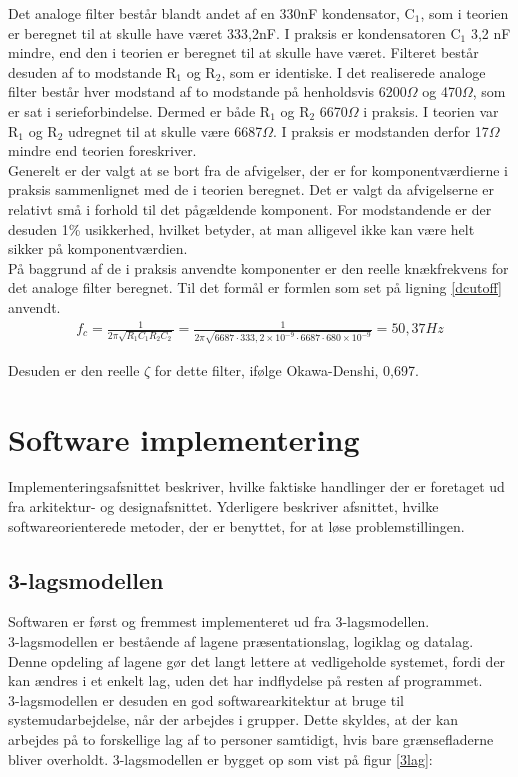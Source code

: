 Det analoge filter består blandt andet af en 330nF kondensator, C$_1$, som i teorien er beregnet til at skulle have været 333,2nF. I praksis er kondensatoren C$_1$ 3,2 nF mindre, end den i teorien er beregnet til at skulle have været. Filteret består desuden af to modstande R$_1$ og R$_2$, som er identiske. I det realiserede analoge filter består hver modstand af to modstande på henholdsvis 6200$\Omega$ og 470$\Omega$, som er sat i serieforbindelse. Dermed er både R$_1$ og R$_2$ 6670$\Omega$ i praksis. I teorien var R$_1$ og R$_2$ udregnet til at skulle være 6687$\Omega$. I praksis er modstanden derfor 17$\Omega$ mindre end teorien foreskriver.\\

Generelt er der valgt at se bort fra de afvigelser, der er for komponentværdierne i praksis sammenlignet med de i teorien beregnet. Det er valgt da afvigelserne er relativt små i forhold til det pågældende komponent. For modstandende er der desuden 1\% usikkerhed, hvilket betyder, at man alligevel ikke kan være helt sikker på komponentværdien.\\

På baggrund af de i praksis anvendte komponenter er den reelle knækfrekvens for det analoge filter beregnet. Til det formål er formlen som set på ligning \ref{dcutoff} anvendt.\\

\begin{align}
f_{c} = \frac{1}{2\pi \sqrt{R_{1}C_{1}R_{2}C_{2}}} = \frac{1}{2\pi \sqrt{6687 \cdot 333,2\times 10^{-9} \cdot 6687 \cdot 680\times 10^{-9}}} = 50,37 Hz
	\label{dcutoff}
\end{align}

Desuden er den reelle $\zeta$ for dette filter, ifølge Okawa-Denshi, 0,697.


\section{Software implementering}\label{implementering}
Implementeringsafsnittet beskriver, hvilke faktiske handlinger der er foretaget ud fra arkitektur- og designafsnittet. Yderligere beskriver afsnittet, hvilke softwareorienterede metoder, der er benyttet, for at løse problemstillingen.

\subsection{3-lagsmodellen}
Softwaren er først og fremmest implementeret ud fra 3-lagsmodellen.\\
3-lagsmodellen er bestående af lagene præsentationslag, logiklag og datalag.
Denne opdeling af lagene gør det langt lettere at vedligeholde systemet, fordi der kan ændres i et enkelt lag, uden det har indflydelse på resten af programmet. \\
3-lagsmodellen er desuden en god softwarearkitektur at bruge til  systemudarbejdelse, når der arbejdes i grupper. Dette skyldes, at der kan arbejdes på to forskellige lag af to personer samtidigt, hvis bare grænsefladerne bliver overholdt. 3-lagsmodellen er bygget op som vist på figur \ref{3lag}:

